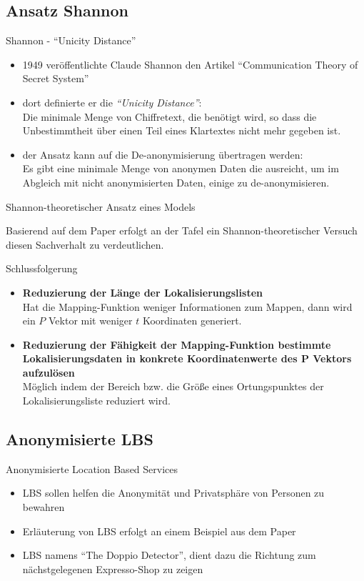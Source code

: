 \subsection{Ansatz Shannon}
\begin{frame}{Shannon - "`Unicity Distance"'}
\begin{itemize}
  \item 1949 veröffentlichte Claude Shannon den Artikel "`Communication Theory of Secret System"'
  \item dort definierte er die \textit{"`Unicity Distance"'}:\\ Die minimale Menge von Chiffretext, die benötigt wird, so dass die Unbestimmtheit über einen Teil eines Klartextes nicht mehr gegeben ist.
  \item der Ansatz kann auf die De-anonymisierung übertragen werden:\\
  Es gibt eine minimale Menge von anonymen Daten die ausreicht, um im Abgleich mit nicht anonymisierten Daten, einige zu de-anonymisieren.
\end{itemize}
\end{frame}

\begin{frame}{Shannon-theoretischer Ansatz eines Models}
\begin{center}
  Basierend auf dem Paper erfolgt an der Tafel ein Shannon-theoretischer Versuch diesen Sachverhalt zu verdeutlichen.
\end{center}
\end{frame}

\begin{frame}{Schlussfolgerung}
\begin{itemize}
  \item \textbf{Reduzierung der Länge der Lokalisierungslisten}\\
  Hat die Mapping-Funktion weniger Informationen zum Mappen, dann wird ein $P$ Vektor mit weniger $t$ Koordinaten generiert.
  \item \textbf{Reduzierung der Fähigkeit der Mapping-Funktion bestimmte Lokalisierungsdaten in konkrete Koordinatenwerte des P Vektors aufzulösen}\\
  Möglich indem der Bereich bzw. die Größe eines Ortungspunktes der Lokalisierungsliste reduziert wird.
\end{itemize}
\end{frame}

\subsection{Anonymisierte LBS}
\begin{frame}{Anonymisierte Location Based Services}
\begin{itemize}
  \item LBS sollen helfen die Anonymität und Privatsphäre von Personen zu bewahren
  \item Erläuterung von LBS erfolgt an einem Beispiel aus dem Paper
  \item LBS namens "`The Doppio Detector"', dient dazu die Richtung zum nächstgelegenen Expresso-Shop zu zeigen
\end{itemize}
\end{frame}

